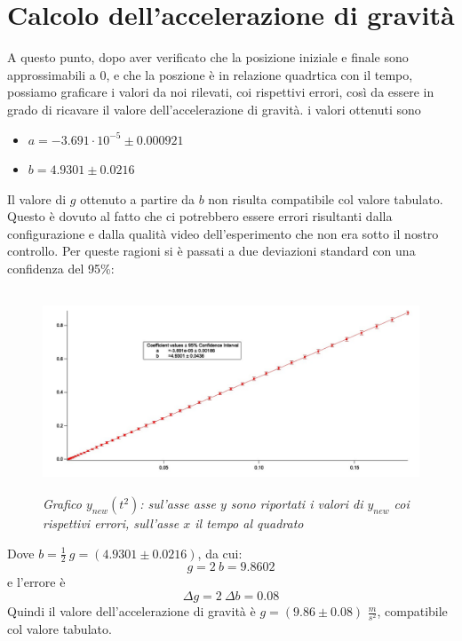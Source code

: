 \documentclass[12pt, a4paper]{article}
\begin{document}
\section{Calcolo dell'accelerazione di gravità}
A questo punto, dopo aver verificato che la posizione iniziale e finale sono approssimabili a $0$, e che la poszione è in relazione quadrtica con il tempo, possiamo graficare i valori da noi rilevati, coi rispettivi errori, così da essere in grado di ricavare il valore dell'accelerazione di gravità. i valori ottenuti sono
\begin{itemize}
    \item $a=-3.691\cdot 10^{-5}\pm 0.000921$
    \item$b=4.9301\pm 0.0216$
\end{itemize}
Il valore di $g$ ottenuto a partire da $b$ non risulta compatibile col valore tabulato. Questo è dovuto al fatto che ci potrebbero essere errori risultanti dalla configurazione e dalla qualità video dell'esperimento che non era sotto il nostro controllo. Per queste ragioni si è passati a due deviazioni standard con una confidenza del 95\%:
  \begin{figure}[h!]
\centering
\includegraphics[width=140mm, height=60mm]{Immagini/Graphy_t^2.jpg}
\caption{\textit{{\footnotesize{Grafico $y_{new}(t^2)$: sul'asse asse $y$ sono riportati i valori di $y_{new}$ coi rispettivi errori, sull'asse $x$ il tempo al quadrato}}}}
\label{Grafico logaritmico}
\end{figure}
\newpage
Dove $b=\frac{1}{2}\ g=(4.9301\pm 0.0216)$, da cui:
\begin{equation*}
    g=2 \ b=9.8602
\end{equation*}
e l'errore è
\begin{equation*}
    \Delta g=2\ \Delta b=0.08
\end{equation*}
Quindi il valore dell'accelerazione di gravità è $g=(9.86\pm0.08)$ $\frac{m}{s^2}$, compatibile col valore tabulato.
\end{document}
